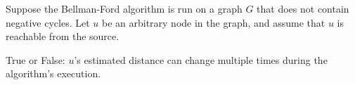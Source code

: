 \begin{prob}
    Suppose the Bellman-Ford algorithm is run on a graph $G$ that does not
    contain negative cycles. Let $u$ be an arbitrary node in the graph, and
    assume that $u$ is reachable from the source.

    True or False: $u$'s estimated distance can change multiple times during
    the algorithm's execution.

    \Tf{}

\end{prob}
